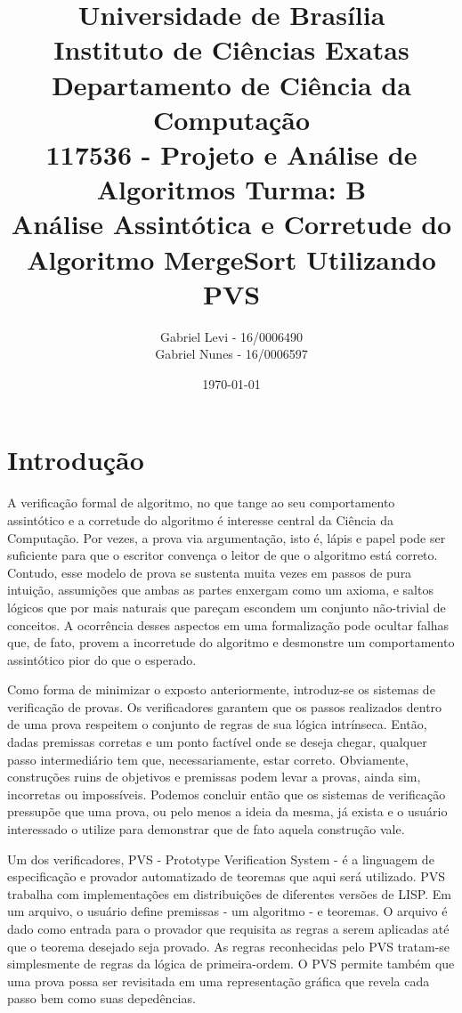 \documentclass[12pt]{article}
\title{{\large Universidade de Brasília \\ Instituto de Ciências Exatas \\
Departamento de Ciência da Computação} \\[1cm]
117536 - Projeto e Análise de Algoritmos Turma: B\\[.5cm]
Análise Assintótica e Corretude do Algoritmo MergeSort Utilizando PVS}
\author{Gabriel Levi - 16/0006490 \\
        Gabriel Nunes - 16/0006597}
\date{\today}
\begin{document}
\maketitle
\newpage

\section{Introdução}
\noindent A verificação formal de algoritmo, no que tange ao seu comportamento assintótico e a corretude do algoritmo é interesse
central da Ciência da Computação. Por vezes, a prova via argumentação, isto é, lápis e papel pode ser suficiente para que o escritor
convença o leitor de que o algoritmo está correto. Contudo, esse modelo de prova se sustenta muita vezes em passos de pura intuição,
assumições que ambas as partes enxergam como um axioma, e saltos lógicos que por mais naturais que pareçam escondem um conjunto não-trivial
de conceitos. A ocorrência desses aspectos em uma formalização pode ocultar falhas que, de fato, provem a incorretude do algoritmo e desmonstre
um comportamento assintótico pior do que o esperado.

Como forma de minimizar o exposto anteriormente, introduz-se os sistemas de verificação de provas. Os verificadores garantem que os passos realizados
dentro de uma prova respeitem o conjunto de regras de sua lógica intrínseca. Então, dadas premissas corretas e um ponto factível onde se deseja chegar, qualquer
passo intermediário tem que, necessariamente, estar correto. Obviamente, construções ruins de objetivos e premissas podem levar a provas, ainda sim, incorretas
ou impossíveis. Podemos concluir então que os sistemas de verificação pressupõe que uma prova, ou pelo menos a ideia da mesma, já exista e o usuário interessado
o utilize para demonstrar que de fato aquela construção vale.

Um dos verificadores, PVS - Prototype Verification System - é a linguagem de especificação e provador automatizado de teoremas que aqui será utilizado.
PVS trabalha com implementações em distribuições de diferentes versões de LISP. Em um arquivo, o usuário define premissas - um algoritmo - e teoremas.
O arquivo é dado como entrada para o provador que requisita as regras a serem aplicadas até que o teorema desejado seja provado. As regras reconhecidas pelo
PVS tratam-se simplesmente de regras da lógica de primeira-ordem. O PVS permite também que uma prova possa ser revisitada em uma representação gráfica que
revela cada passo bem como suas depedências.
\end{document}

